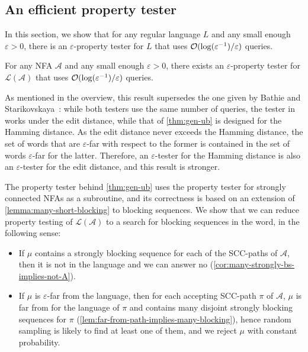 \documentclass[letterpaper, USenglish, cleveref, autoref, thm-restate, numberwithinsect]{lipics-v2021}
\theoremstyle{theorem}
\theoremstyle{definition}
\newcommand{\Aa}{\mathcal{A}}
\newcommand{\cO}{\mathcal{O}}
\newcommand{\eps}{\varepsilon}
\newcommand{\lang}[1]{\mathcal{L}(#1)}
\newcommand{\SCCpath}{\pi}
\newcommand{\epslogeps}[1][]
{\ifthenelse{\equal{#1}{}}{\log(\eps^{-1})/\eps}{\log^{ #1 }(\eps^{-1})/\eps}}
\begin{document}
\subsection{An efficient property tester}\label{sec:generic-ub}

In this section, we show that for any regular language $L$ and any small enough $\eps > 0$, there is an $\eps$-property tester for $L$ that uses $\cO(\epslogeps)$ queries.

\begin{theorem}\label{thm:gen-ub}
    For any NFA $\Aa$ and any small enough $\eps  >0$, there exists an $\eps$-property tester for $\lang{\Aa}$ that uses $\cO(\epslogeps)$ queries. 
\end{theorem}

As mentioned in the overview, this result supersedes the one  given by Bathie and Starikovskaya~\cite{bathie2021property}:
while both testers use the same number of queries, the tester in~\cite{bathie2021property} works under the edit distance, while that of \cref{thm:gen-ub} is designed for the Hamming distance. As the edit distance never exceeds the Hamming distance, the set of words that are $\eps$-far with respect to the former is contained in the set of words $\eps$-far for the latter. Therefore, an $\eps$-tester for the Hamming distance is also an $\eps$-tester for the edit distance, and this result is stronger.

The property tester behind \cref{thm:gen-ub} uses the property tester for strongly connected NFAs as a subroutine, and its correctness is based on an extension of \cref{lemma:many-short-blocking} to blocking sequences.
We show that we can reduce property testing of $\lang{\Aa}$ to a search for blocking sequences in the word, in the following sense:
\begin{itemize}
	\item If $\mu$ contains a strongly blocking sequence for each of the SCC-paths of $\Aa$, then it is not in the language and we can answer no (\cref{cor:many-strongly-bs-implies-not-A}).
	\item If $\mu$ is $\eps$-far from the language, then for each accepting SCC-path $\SCCpath$ of $\Aa$, $\mu$ is far from for the language of $\SCCpath$ and contains many disjoint strongly blocking sequences for $\SCCpath$ (\cref{lem:far-from-path-implies-many-blocking}), hence random sampling is likely to find at least one of them, and we reject $\mu$ with constant probability.
\end{itemize}
\end{document}
